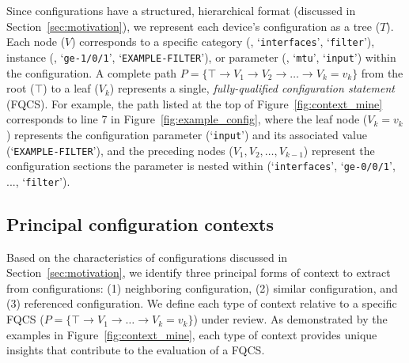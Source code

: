 Since configurations have a structured, hierarchical format (discussed in Section~\ref{sec:motivation}), we represent each device's configuration as a tree ($T$).
Each node (\(V\)) corresponds to a specific 
category (\eg, `{\tt interfaces}', `{\tt filter}'), instance (\eg, `{\tt ge-1/0/1}', `{\tt EXAMPLE-FILTER}'), or parameter (\eg, `{\tt mtu}', `{\tt input}') within the configuration.
A complete path \(
P = \{ \top \rightarrow V_1 \rightarrow V_2 \rightarrow \dots \rightarrow V_k = v_k \}
\) from the root ($\top$) to a leaf ($V_k$) represents a single, \textit{fully-qualified configuration statement} (FQCS). For example, the path listed at the top of Figure~\ref{fig:context_mine} corresponds to line 7 in Figure~\ref{fig:example_config}, where the leaf node ($V_k = v_k$) represents the configuration parameter (`{\tt input}') and its associated value (`{\tt EXAMPLE-FILTER}'), and the preceding nodes ($V_1, V_2, \dots, V_{k-1}$) represent the configuration sections the parameter is nested within (`{\tt interfaces}', `{\tt ge-0/0/1}', ..., `{\tt filter}').



\subsection{Principal configuration contexts} 
Based on the characteristics of configurations discussed in Section~\ref{sec:motivation}, we identify three principal forms of context to extract from configurations: (1) neighboring configuration, (2) similar configuration, and (3) referenced configuration.
We define each type of context relative to a specific FQCS ($P = \{ \top \rightarrow V_1 \rightarrow \dots \rightarrow V_k = v_k \}$) under review. As demonstrated by the examples in Figure~\ref{fig:context_mine}, each type of context provides unique insights that contribute to the evaluation of a FQCS. 


